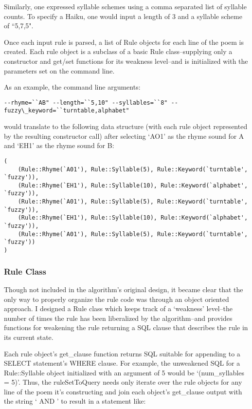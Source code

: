 \documentclass[10pt]{article}
\begin{document}
Similarly, one expressed syllable schemes using a comma separated list of
syllable counts. To specify a Haiku, one would input a length of 3 and a
syllable scheme of ``5,7,5".

Once each input rule is parsed, a list of Rule objects for each line of the
poem is created. Each rule object is a subclass of a basic Rule
class--supplying only a constructor and get/set functions for its weakness
level--and is initialized with the parameters set on the command line.

As an example, the command line arguments:
\begin{verbatim}
--rhyme=``AB" --length=``5,10" --syllables=``8" --fuzzy\_keyword=``turntable,alphabet"
\end{verbatim}
would translate to the following data structure (with each rule object
represented by the resulting constructor call) after selecting `AO1' as the
rhyme sound for A and `EH1' as the rhyme sound for B:

\begin{verbatim}
(
    (Rule::Rhyme(`A01'), Rule::Syllable(5), Rule::Keyword(`turntable', `fuzzy')),
    (Rule::Rhyme(`EH1'), Rule::Syllable(10), Rule::Keyword(`alphabet', `fuzzy')),
    (Rule::Rhyme(`A01'), Rule::Syllable(5), Rule::Keyword(`turntable', `fuzzy')),
    (Rule::Rhyme(`EH1'), Rule::Syllable(10), Rule::Keyword(`alphabet', `fuzzy')),
    (Rule::Rhyme(`A01'), Rule::Syllable(5), Rule::Keyword(`turntable', `fuzzy'))
)
\end{verbatim}

\subsubsection{Rule Class}
Though not included in the algorithm's original design, it became clear that
the only way to properly organize the rule code was through an object oriented
approach. I designed a Rule class which keeps track of a `weakness' level--the
number of times the rule has been liberalized by the algorithm--and provides
functions for weakening the rule returning a SQL clause that describes the rule
in its current state.

Each rule object's get\_clause function returns SQL suitable for appending to a
SELECT statement's WHERE clause. For example, the unweakened SQL for a
Rule::Syllable object initialized with an argument of 5 would be
`(num\_syllables = 5)'. Thus, the ruleSetToQuery needs only iterate over the
rule objects for any line of the poem it's constructing and join each object's
get\_clause output with the string ` AND ' to result in a statement like:
\end{document}
